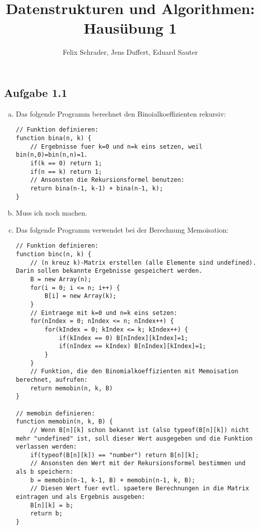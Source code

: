 \documentclass[11pt]{article}
\author{Felix Schrader, Jens Duffert, Eduard Sauter}
\title{Datenstrukturen und Algorithmen: Haus\"ubung 1}
\begin{document}
\maketitle

\subsection*{Aufgabe 1.1}
\begin{enumerate}[a)]

\item Das folgende Programm berechnet den Binoialkoeffizienten rekursiv:

\begin{lstlisting}
// Funktion definieren:
function bina(n, k) {
	// Ergebnisse fuer k=0 und n=k eins setzen, weil bin(n,0)=bin(n,n)=1.
	if(k == 0) return 1;
	if(n == k) return 1;
	// Ansonsten die Rekursionsformel benutzen:
	return bina(n-1, k-1) + bina(n-1, k);
}
\end{lstlisting}

\item Muss ich noch machen.

\item Das folgende Programm verwendet bei der Berechnung Memoisation:

\begin{lstlisting}
// Funktion definieren:
function binc(n, k) {
	// (n kreuz k)-Matrix erstellen (alle Elemente sind undefined). Darin sollen bekannte Ergebnisse gespeichert werden.
	B = new Array(n);
	for(i = 0; i <= n; i++) {
		B[i] = new Array(k);
	}
	// Eintraege mit k=0 und n=k eins setzen:
	for(nIndex = 0; nIndex <= n; nIndex++) {
		for(kIndex = 0; kIndex <= k; kIndex++) {
			if(kIndex == 0) B[nIndex][kIndex]=1;
			if(nIndex == kIndex) B[nIndex][kIndex]=1;
		}
	}
	// Funktion, die den Binomialkoeffizienten mit Memoisation berechnet, aufrufen:
	return memobin(n, k, B)
}

// memobin definieren:
function memobin(n, k, B) {
	// Wenn B[n][k] schon bekannt ist (also typeof(B[n][k]) nicht mehr "undefined" ist, soll dieser Wert ausgegeben und die Funktion verlassen werden:
	if(typeof(B[n][k]) == "number") return B[n][k];
	// Ansonsten den Wert mit der Rekursionsformel bestimmen und als b speichern:
	b = memobin(n-1, k-1, B) + memobin(n-1, k, B);
	// Diesen Wert fuer evtl. spaetere Berechnungen in die Matrix eintragen und als Ergebnis ausgeben:
	B[n][k] = b;
	return b;
}
\end{lstlisting}

\end{enumerate}
\end{document}
